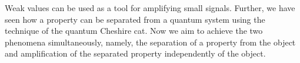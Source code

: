 \documentclass[aps,pra,showpacs,twoside,twocolumn,10pt]{revtex4-1}
\begin{document}
Weak values can be used as a tool for amplifying small signals. Further, we have seen how a property can be separated from a quantum system using the technique of the quantum Cheshire cat. Now we aim to achieve the two phenomena simultaneously, namely, the separation of a property from the object and amplification of the separated property independently of the object. 


\end{document}
